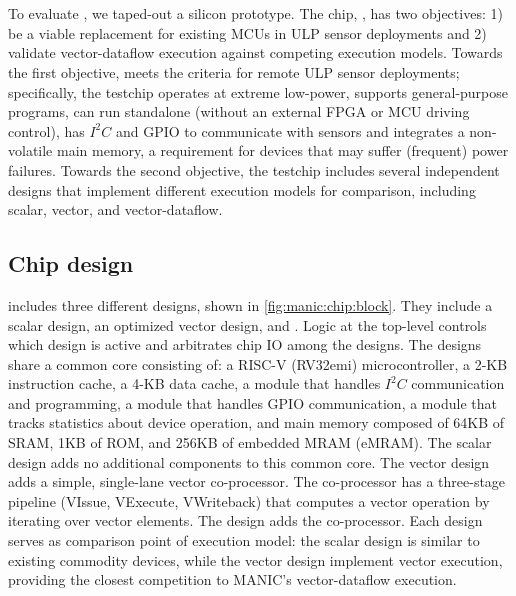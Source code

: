 
\section{\msilicon}
\label{manic:silicon}
To evaluate \manic, we taped-out a silicon prototype. 
% 
The chip, \msilicon, has two objectives: 1) be a viable replacement for existing MCUs in ULP sensor deployments and 2) validate vector-dataflow execution against competing execution models.
% 
Towards the first objective, \msilicon meets the criteria for remote ULP sensor deployments; specifically, the testchip operates at extreme low-power, supports general-purpose programs, can run standalone (without an external FPGA or MCU driving control), has $I^2 C$ and GPIO to communicate with sensors and integrates a non-volatile main memory, a requirement for devices that may suffer (frequent) power failures.
% 
Towards the second objective, the \msilicon testchip includes several independent designs that implement different execution models for comparison, including scalar, vector, and vector-dataflow.

\figMANICChipBlock
\subsection{Chip design}
\msilicon includes three different designs, shown in \autoref{fig:manic:chip:block}.
%
They include a scalar design, an optimized vector design, and \manic.
% 
Logic at the top-level controls which design is active and arbitrates chip IO among the designs.
%
The designs share a common core consisting of: a RISC-V (RV32emi) microcontroller, a 2-KB instruction cache, a 4-KB data cache, a module that handles $I^2 C$ communication and programming, a module that handles GPIO communication, a module that tracks statistics about device operation, and main memory composed of 64KB of SRAM, 1KB of ROM, and 256KB of embedded MRAM (eMRAM). 
% 
The scalar design adds no additional components to this common core.
% 
The vector design adds a simple, single-lane vector co-processor.
% 
The co-processor has a three-stage pipeline (VIssue, VExecute, VWriteback) that computes a vector operation by iterating over vector elements.
% 
The \manic design adds the \manic co-processor.
% 
Each design serves as comparison point of execution model: the scalar design is similar to existing commodity devices, while the vector design implement vector execution, providing the closest competition to MANIC's vector-dataflow execution.

